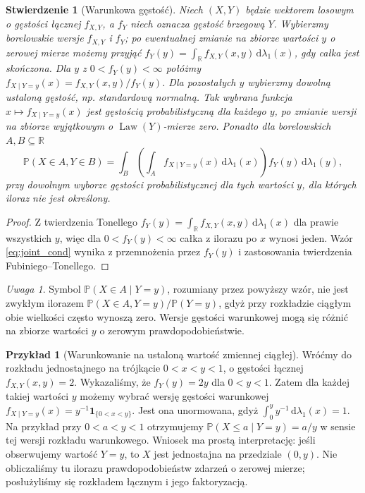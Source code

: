 \documentclass[11pt,a4paper,oneside]{report}
\numberwithin{equation}{chapter}
\theoremstyle{plain}
\newtheorem{stwierdzenie}[twierdzenie]{Stwierdzenie}
\theoremstyle{definition}
\newtheorem{przyklad}{Przykład}[chapter]
\theoremstyle{remark}
\newtheorem{uwaga}{Uwaga}[chapter]
\newcommand{\R}{\mathbb{R}}
\newcommand{\Prob}{\mathbb{P}}
\newcommand{\Law}{\operatorname{Law}}
\newcommand{\ind}[1]{\mathbf{1}_{#1}}
\newcommand{\dd}{\mathrm{d}}
\begin{document}
\begin{stwierdzenie}[Warunkowa gęstość]
Niech $(X,Y)$ będzie wektorem losowym o gęstości łącznej $f_{X,Y}$,
a $f_Y$ niech oznacza gęstość brzegową $Y$.
Wybierzmy borelowskie wersje $f_{X,Y}$ i $f_Y$; po ewentualnej
zmianie na zbiorze wartości $y$ o zerowej mierze możemy przyjąć
$f_Y(y)=\int_\R f_{X,Y}(x,y)\,\dd\lambda_1(x)$,
gdy całka jest skończona. Dla $y$ z $0<f_Y(y)<\infty$
połóżmy $f_{X\mid Y=y}(x)=f_{X,Y}(x,y)/f_Y(y)$.
Dla pozostałych $y$ wybierzmy dowolną ustaloną gęstość,
np. standardową normalną. Tak wybrana funkcja
$x\mapsto f_{X\mid Y=y}(x)$ jest gęstością
probabilistyczną dla każdego $y$, po zmianie wersji na zbiorze
wyjątkowym o $\Law(Y)$-mierze zero.
Ponadto dla borelowskich $A,B\subseteq\R$
\begin{equation}\label{eq:joint_cond}
\Prob(X\in A,Y\in B)
=\int_B\left(\int_A f_{X\mid Y=y}(x)\,\dd\lambda_1(x)\right)
 f_Y(y)\,\dd\lambda_1(y),
\end{equation}
przy dowolnym wyborze gęstości probabilistycznej dla tych wartości $y$,
dla których iloraz nie jest określony.
\end{stwierdzenie}
\begin{proof}
Z twierdzenia Tonellego $f_Y(y)=\int_\R f_{X,Y}(x,y)\,
\dd\lambda_1(x)$ dla prawie wszystkich $y$, więc dla
$0<f_Y(y)<\infty$ całka z ilorazu po $x$ wynosi jeden.
Wzór \eqref{eq:joint_cond} wynika z przemnożenia przez $f_Y(y)$
i zastosowania twierdzenia Fubiniego--Tonellego.
\end{proof}

\begin{uwaga}
Symbol $\Prob(X\in A\mid Y=y)$, rozumiany przez powyższy wzór,
nie jest zwykłym ilorazem $\Prob(X\in A,Y=y)/\Prob(Y=y)$,
gdyż przy rozkładzie ciągłym obie wielkości często wynoszą zero.
Wersje gęstości warunkowej mogą się różnić na zbiorze wartości $y$
o zerowym prawdopodobieństwie.
\end{uwaga}

\begin{przyklad}[Warunkowanie na ustaloną wartość zmiennej ciągłej]
Wróćmy do rozkładu jednostajnego na trójkącie
$0<x<y<1$, o gęstości łącznej $f_{X,Y}(x,y)=2$.
Wykazaliśmy, że $f_Y(y)=2y$ dla $0<y<1$.
Zatem dla każdej takiej wartości $y$ możemy wybrać
wersję gęstości warunkowej
$f_{X\mid Y=y}(x)=y^{-1}\ind{\{0<x<y\}}$.
Jest ona unormowana, gdyż $\int_0^y y^{-1}\,\dd\lambda_1(x)=1$.
Na przykład przy $0<a<y<1$ otrzymujemy
$\Prob(X\leq a\mid Y=y)=a/y$ w sensie tej wersji
rozkładu warunkowego. Wniosek ma prostą interpretację:
jeśli obserwujemy wartość $Y=y$, to $X$ jest jednostajna
na przedziale $(0,y)$. Nie obliczaliśmy tu ilorazu
prawdopodobieństw zdarzeń o zerowej mierze;
posłużyliśmy się rozkładem łącznym i jego faktoryzacją.
\end{przyklad}
\end{document}
